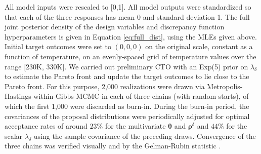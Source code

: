 \documentclass[12pt]{article}
\begin{document}
%
All model inputs were rescaled to [0,1].
%
All model outputs were standardized so that each of the three responses has mean 0 and standard deviation 1.
%
The full joint posterior density of the design variables and discrepancy function hyperparameters is given in Equation \eqref{eq:full_dist}, using the MLEs given above.
%
Initial target outcomes were set to $(0,0,0)$ on the original scale, constant as a function of temperature, on an evenly-spaced grid of temperature values over the range [230K, 330K].
%
We carried out preliminary CTO with an Exp(5) prior on $\lambda_\delta$ to estimate the Pareto front and update the target outcomes to lie close to the Pareto front. %
%
For this purpose, 2,000 realizations were drawn via Metropolis-Hastings-within-Gibbs MCMC \citep{Metropolis1953, Hastings1970, Geman1984} in each of three chains (with random starts), of which the first 1,000 were discarded as burn-in.
%
During the burn-in period, the covariances of the proposal distributions were periodically adjusted for optimal acceptance rates of around $23\%$ for the multivariate $\boldsymbol \theta$ and $\boldsymbol\rho^\delta$ \citep{Roberts1997} and $44\%$ for the scalar $\lambda_\delta$ \citep[][p. 296]{Gelman2013} using the sample covariance of the preceding draws. %
%
%
%
Convergence of the three chains was verified visually and by the Gelman-Rubin statistic \citep[$\approx1.01$;][]{Gelman1992a}.
%
\end{document}
